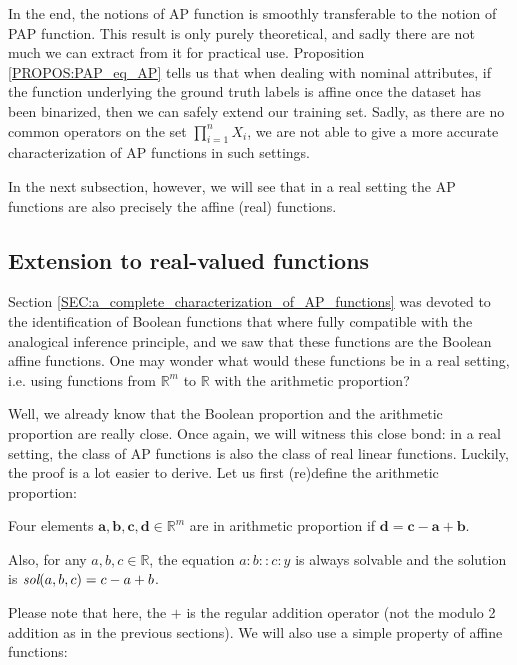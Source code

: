 In the end, the notions of AP function is smoothly transferable to the notion
of PAP function. This result is only purely theoretical, and sadly there are
not much we can extract from it for practical use. Proposition
\ref{PROPOS:PAP_eq_AP} tells us that when dealing with nominal attributes, if
the function underlying the ground truth labels is affine once the dataset has
been binarized, then we can safely extend our training set. Sadly, as there are
no common operators on the set  $\prod_{i=1}^n X_i$, we are not able to give a
more accurate characterization of AP functions in such settings.

In the next subsection, however, we will see that in a real setting the AP
functions are also precisely the affine (real) functions.

\subsection{Extension to real-valued functions}
\label{SEC:extension_to_real_valued_functions}

Section \ref{SEC:a_complete_characterization_of_AP_functions} was devoted to the
identification of Boolean functions that where fully compatible with the
analogical inference principle, and we saw that
these functions are the Boolean affine functions. One may wonder what would
these functions be in a real setting, i.e. using functions  from $\mathbb{R}^m$
to $\mathbb{R}$ with the arithmetic proportion?

Well, we already know that the Boolean proportion and the arithmetic proportion
are really close. Once again, we will witness this close bond: in a real
setting, the class of AP functions is also the class of real linear functions.
Luckily, the proof is a lot easier to derive.  Let us first (re)define the
arithmetic proportion:
\begin{property}
  \label{PROPER:sol_arithm_prop}
  Four elements $\mathbf{a}, \mathbf{b}, \mathbf{c}, \mathbf{d} \in
  \mathbb{R}^m$ are in arithmetic proportion if $\mathbf{d} = \mathbf{c} -
  \mathbf{a} + \mathbf{b}$.

  Also, for any $a, b, c \in \mathbb{R}$, the equation $a : b :: c:y$ is always
  solvable and the solution is $\emph{sol}(a, b, c) = c - a + b$.
\end{property}

Please note that here, the $+$ is the regular addition operator (not the modulo
2 addition as in the previous sections). We will also use a simple property of
affine functions:

